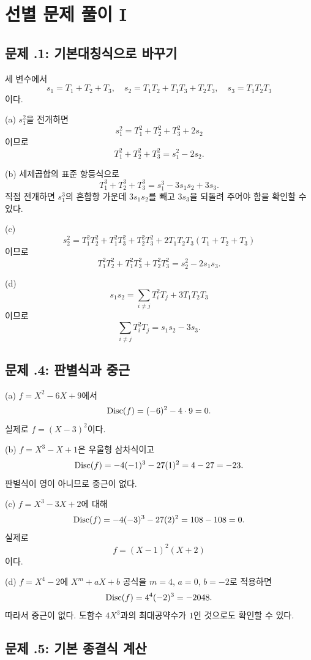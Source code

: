 \section{선별 문제 풀이 I}
\label{sec:symmetric-discriminant-solutions-a}

\subsection*{문제 \thechapter.1: 기본대칭식으로 바꾸기}

\begin{solution}
세 변수에서
\[
  s_1=T_1+T_2+T_3,
  \quad
  s_2=T_1T_2+T_1T_3+T_2T_3,
  \quad
  s_3=T_1T_2T_3
\]
이다.

(a) $s_1^2$을 전개하면
\[
  s_1^2=T_1^2+T_2^2+T_3^2+2s_2
\]
이므로
\[
  T_1^2+T_2^2+T_3^2=s_1^2-2s_2.
\]

(b) 세제곱합의 표준 항등식으로
\[
  T_1^3+T_2^3+T_3^3
  =s_1^3-3s_1s_2+3s_3.
\]
직접 전개하면 $s_1^3$의 혼합항 가운데 $3s_1s_2$를 빼고 $3s_3$을 되돌려 주어야 함을 확인할 수 있다.

(c)
\[
  s_2^2
  =T_1^2T_2^2+T_1^2T_3^2+T_2^2T_3^2
  +2T_1T_2T_3(T_1+T_2+T_3)
\]
이므로
\[
  T_1^2T_2^2+T_1^2T_3^2+T_2^2T_3^2
  =s_2^2-2s_1s_3.
\]

(d)
\[
  s_1s_2
  =\sum_{i\ne j}T_i^2T_j+3T_1T_2T_3
\]
이므로
\[
  \sum_{i\ne j}T_i^2T_j=s_1s_2-3s_3.
\]
\end{solution}

\subsection*{문제 \thechapter.4: 판별식과 중근}

\begin{solution}
(a) $f=X^2-6X+9$에서
\[
  \operatorname{Disc}(f)=(-6)^2-4\cdot9=0.
\]
실제로 $f=(X-3)^2$이다.

(b) $f=X^3-X+1$은 우울형 삼차식이고
\[
  \operatorname{Disc}(f)=-4(-1)^3-27(1)^2=4-27=-23.
\]
판별식이 영이 아니므로 중근이 없다.

(c) $f=X^3-3X+2$에 대해
\[
  \operatorname{Disc}(f)=-4(-3)^3-27(2)^2=108-108=0.
\]
실제로
\[
  f=(X-1)^2(X+2)
\]
이다.

(d) $f=X^4-2$에 $X^m+aX+b$ 공식을 $m=4$, $a=0$, $b=-2$로 적용하면
\[
  \operatorname{Disc}(f)=4^4(-2)^3=-2048.
\]
따라서 중근이 없다. 도함수 $4X^3$과의 최대공약수가 $1$인 것으로도 확인할 수 있다.
\end{solution}

\subsection*{문제 \thechapter.5: 기본 종결식 계산}

